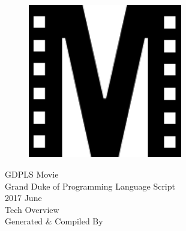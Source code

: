\documentclass[a4paper]{article}
\begin{document}
  \thispagestyle{empty}
  \begin{center}
    \bfseries
    \nbvspace[2]
    \begin{figure}[H]
      \centering
      \includegraphics[width=0.6\textwidth]{../logo.pdf}
    \end{figure}
    {\Huge GDPLS Movie} \\[10pt]
    {\LARGE\akaDora Grand Duke of Programming Language Script}\\[10pt]
    {\Huge 2017 June} \\
    \nbvspace[1]
    \Huge Tech Overview\\
    \nbvspace[1]
    \normalsize Generated \& Compiled By \XeLaTeX
    \nbvspace[3]
  \end{center}
  \newpage
  
  

\end{document}
